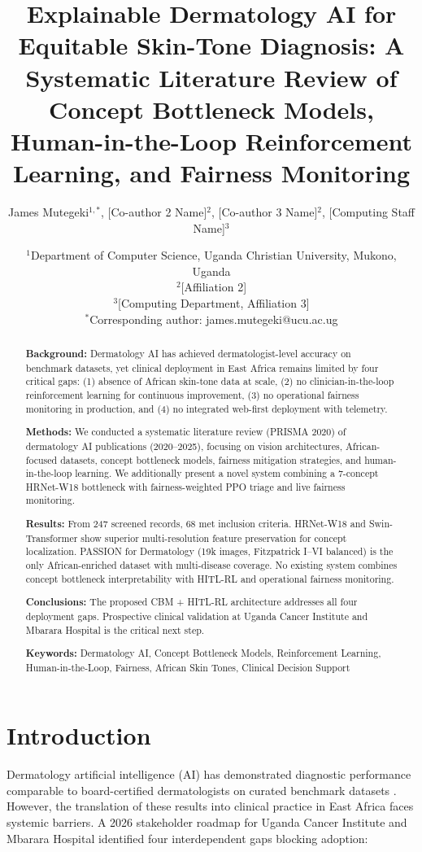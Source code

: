 \documentclass[12pt,a4paper]{article}
\title{Explainable Dermatology AI for Equitable Skin-Tone Diagnosis: 
A Systematic Literature Review of Concept Bottleneck Models, 
Human-in-the-Loop Reinforcement Learning, and Fairness Monitoring}
\author{
    James Mutegeki$^{1,*}$,
    [Co-author 2 Name]$^{2}$,
    [Co-author 3 Name]$^{2}$,
    [Computing Staff Name]$^{3}$
}
\date{
    $^{1}$Department of Computer Science, Uganda Christian University, Mukono, Uganda\\
    $^{2}$[Affiliation 2]\\
    $^{3}$[Computing Department, Affiliation 3]\\
    $^{*}$Corresponding author: james.mutegeki@ucu.ac.ug
}
\begin{document}
\maketitle

\begin{abstract}
\textbf{Background:} Dermatology AI has achieved dermatologist-level accuracy on benchmark datasets, yet clinical deployment in East Africa remains limited by four critical gaps: (1) absence of African skin-tone data at scale, (2) no clinician-in-the-loop reinforcement learning for continuous improvement, (3) no operational fairness monitoring in production, and (4) no integrated web-first deployment with telemetry.

\textbf{Methods:} We conducted a systematic literature review (PRISMA 2020) of dermatology AI publications (2020--2025), focusing on vision architectures, African-focused datasets, concept bottleneck models, fairness mitigation strategies, and human-in-the-loop learning. We additionally present a novel system combining a 7-concept HRNet-W18 bottleneck with fairness-weighted PPO triage and live fairness monitoring.

\textbf{Results:} From 247 screened records, 68 met inclusion criteria. HRNet-W18 and Swin-Transformer show superior multi-resolution feature preservation for concept localization. PASSION for Dermatology (19k images, Fitzpatrick I--VI balanced) is the only African-enriched dataset with multi-disease coverage. No existing system combines concept bottleneck interpretability with HITL-RL and operational fairness monitoring.

\textbf{Conclusions:} The proposed CBM + HITL-RL architecture addresses all four deployment gaps. Prospective clinical validation at Uganda Cancer Institute and Mbarara Hospital is the critical next step.

\textbf{Keywords:} Dermatology AI, Concept Bottleneck Models, Reinforcement Learning, Human-in-the-Loop, Fairness, African Skin Tones, Clinical Decision Support
\end{abstract}

\section{Introduction}
\label{sec:intro}

Dermatology artificial intelligence (AI) has demonstrated diagnostic performance comparable to board-certified dermatologists on curated benchmark datasets \cite{esteva2017dermatologist, tschandl2020human}. However, the translation of these results into clinical practice in East Africa faces systemic barriers. A 2026 stakeholder roadmap for Uganda Cancer Institute and Mbarara Hospital identified four interdependent gaps blocking adoption:
\end{document}
